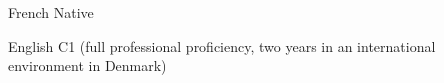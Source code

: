 


\begin{cvskills}


\cvskill
{French}
{Native}


\cvskill
{English}
{C1 (full professional proficiency, two years in an international environment in Denmark)}


\end{cvskills}
